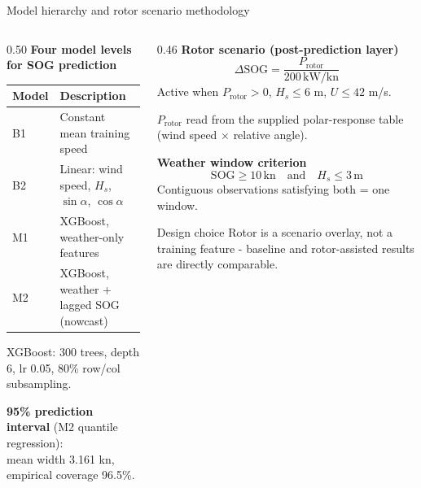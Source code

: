 \documentclass[aspectratio=169]{beamer}
\begin{document}
\begin{frame}{Model hierarchy and rotor scenario methodology}
\begin{columns}
\begin{column}{0.50\textwidth}
\footnotesize
\textbf{Four model levels for SOG prediction}
\begin{center}
\begin{tabular}{lp{4.4cm}}
\toprule
\textbf{Model} & \textbf{Description} \\
\midrule
B1 & Constant mean training speed \\
B2 & Linear: wind speed, $H_s$, $\sin\alpha$, $\cos\alpha$ \\
M1 & XGBoost, weather-only features \\
M2 & XGBoost, weather + lagged SOG (nowcast) \\
\bottomrule
\end{tabular}
\end{center}
XGBoost: 300 trees, depth 6, lr 0.05, 80\% row/col subsampling.

\vspace{0.2cm}
\textbf{95\% prediction interval} (M2 quantile regression):\\
mean width 3.161 kn, empirical coverage 96.5\%.
\end{column}
\begin{column}{0.46\textwidth}
\footnotesize
\textbf{Rotor scenario (post-prediction layer)}
\[
\Delta\text{SOG} = \frac{P_\text{rotor}}{200\,\text{kW/kn}}
\]
Active when $P_\text{rotor}>0$, $H_s \leq 6$ m, $U \leq 42$ m/s.

$P_\text{rotor}$ read from the supplied polar-response table (wind speed $\times$ relative angle).

\vspace{0.1cm}
\textbf{Weather window criterion}
\[
\text{SOG} \geq 10\,\text{kn} \quad\text{and}\quad H_s \leq 3\,\text{m}
\]
Contiguous observations satisfying both = one window.

\begin{block}{Design choice}
Rotor is a scenario overlay, not a training feature - baseline and rotor-assisted results are directly comparable.
\end{block}
\end{column}
\end{columns}
\end{frame}

\end{document}
